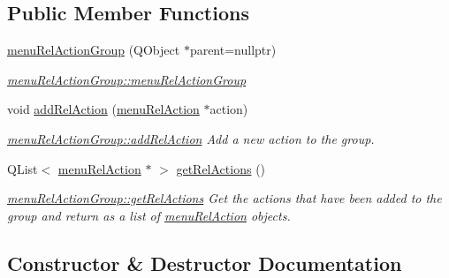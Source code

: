 \subsection*{Public Member Functions}
\begin{DoxyCompactItemize}
\item 
\mbox{\hyperlink{classmenu_rel_action_group_ac43afaa3a021c3543d31e2401944938e}{menu\+Rel\+Action\+Group}} (Q\+Object $\ast$parent=nullptr)
\begin{DoxyCompactList}\small\item\em \mbox{\hyperlink{classmenu_rel_action_group_ac43afaa3a021c3543d31e2401944938e}{menu\+Rel\+Action\+Group\+::menu\+Rel\+Action\+Group}} \end{DoxyCompactList}\item 
void \mbox{\hyperlink{classmenu_rel_action_group_a7b36eb218ae45fd971c1bfca5eb465c4}{add\+Rel\+Action}} (\mbox{\hyperlink{classmenu_rel_action}{menu\+Rel\+Action}} $\ast$action)
\begin{DoxyCompactList}\small\item\em \mbox{\hyperlink{classmenu_rel_action_group_a7b36eb218ae45fd971c1bfca5eb465c4}{menu\+Rel\+Action\+Group\+::add\+Rel\+Action}} Add a new action to the group. \end{DoxyCompactList}\item 
Q\+List$<$ \mbox{\hyperlink{classmenu_rel_action}{menu\+Rel\+Action}} $\ast$ $>$ \mbox{\hyperlink{classmenu_rel_action_group_ac050bdcde34d72fc17c4fed70d2bfa6c}{get\+Rel\+Actions}} ()
\begin{DoxyCompactList}\small\item\em \mbox{\hyperlink{classmenu_rel_action_group_ac050bdcde34d72fc17c4fed70d2bfa6c}{menu\+Rel\+Action\+Group\+::get\+Rel\+Actions}} Get the actions that have been added to the group and return as a list of \mbox{\hyperlink{classmenu_rel_action}{menu\+Rel\+Action}} objects. \end{DoxyCompactList}\end{DoxyCompactItemize}


\subsection{Constructor \& Destructor Documentation}
\mbox{\label{classmenu_rel_action_group_ac43afaa3a021c3543d31e2401944938e}} 
